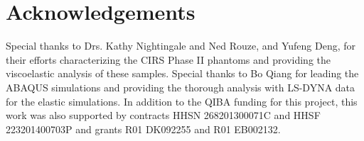\section{Acknowledgements}
Special thanks to Drs. Kathy Nightingale and Ned Rouze, and Yufeng Deng, for
their efforts characterizing the CIRS Phase II phantoms and providing the
viscoelastic analysis of these samples.  Special thanks to Bo Qiang for leading
the ABAQUS simulations and providing the thorough analysis with LS-DYNA data
for the elastic simulations.  In addition to the QIBA funding for this project,
this work was also supported by contracts HHSN 268201300071C and HHSF
223201400703P and grants R01 DK092255 and R01 EB002132.
